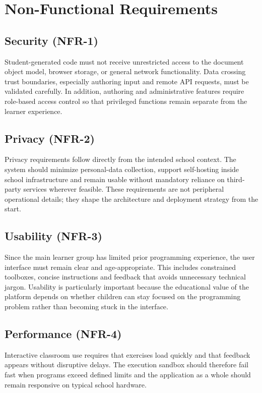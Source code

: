 \section{Non-Functional Requirements}
\label{sec:non-req-functional}
\subsection*{Security (NFR-1)}
Student-generated code must not receive unrestricted access to the document object model, browser storage, or general network functionality. Data crossing trust boundaries, especially authoring
input and remote API requests, must be validated carefully. In addition, authoring and administrative features require role-based access control so that privileged functions remain separate from the learner experience.

\subsection*{Privacy (NFR-2)}
Privacy requirements follow directly from the intended school context. The system should minimize personal-data collection, support self-hosting inside school infrastructure and remain
usable without mandatory reliance on third-party services wherever feasible. These requirements are not peripheral operational details; they shape the architecture and deployment strategy from the start.

\subsection*{Usability (NFR-3)}
Since the main learner group has limited prior programming experience, the user interface must remain clear and age-appropriate. This includes constrained toolboxes, concise instructions and feedback 
that avoids unnecessary technical jargon. Usability is particularly important because the educational value of the platform depends on whether children can stay focused on the
programming problem rather than becoming stuck in the interface. 

\subsection*{Performance (NFR-4)}
Interactive classroom use requires that exercises load quickly and that feedback appears without disruptive delays. The execution sandbox should therefore fail fast when programs exceed
defined limits and the application as a whole should remain responsive on typical school hardware.

